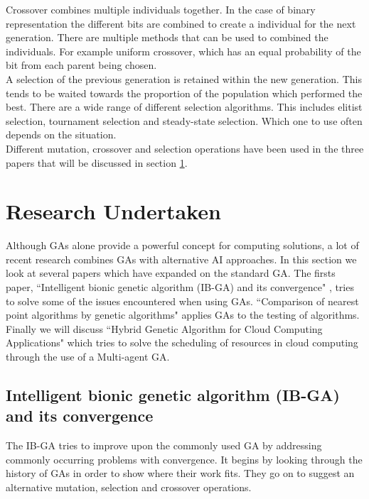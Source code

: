 \documentclass[10pt,a4paper,openbib]{article}
\begin{document}
\begin{multicols}{2}
\noindent Crossover combines multiple individuals together. In the case of binary representation the different bits are combined to create a individual for the next generation. There are multiple methods that can be used to combined the individuals. For example uniform crossover, which has an equal probability of the bit from each parent being chosen. \\

\noindent A selection of the previous generation is retained within the new generation. This tends to be waited towards the proportion of the population which performed the best. There are a wide range of different selection algorithms. This includes elitist selection, tournament selection and steady-state selection.\cite{geneticsWebsite}  Which one to use often depends on the situation. \\

\noindent Different mutation, crossover and selection operations have been used in the three papers that will be discussed in section \ref{research}.

\section{Research Undertaken} \label{research}
Although GAs alone provide a powerful concept for computing solutions, a lot of recent research combines GAs with alternative AI approaches. In this section we look at several papers which have expanded on the standard GA. The firsts paper, ``Intelligent bionic genetic algorithm (IB-GA) and its convergence" \cite{IB_GA}, tries to solve some of the issues encountered when using GAs.  ``Comparison of nearest point algorithms by genetic algorithms" \cite{nearestPoint} applies GAs to the testing of algorithms. Finally we will discuss ``Hybrid Genetic Algorithm for Cloud Computing Applications" \cite{CloudComputing} which tries to solve the scheduling of resources in cloud computing through the use of a Multi-agent GA.

\subsection{Intelligent bionic genetic algorithm (IB-GA) and its convergence \cite{IB_GA}} \label{IB-GA}
The IB-GA tries to improve upon the commonly used GA by addressing commonly occurring problems with convergence. It begins by looking through the history of GAs in order to show where their work fits. They go on to suggest an alternative mutation, selection and crossover operations.\\


\end{multicols}
\end{document}
